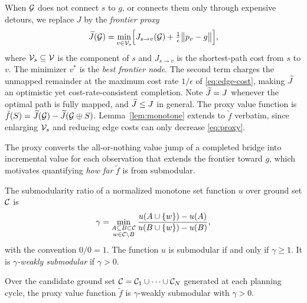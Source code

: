 When $\mathcal{G}$ does not connect $s$ to $g$, or connects them only through expensive detours, we replace $J$ by the \emph{frontier proxy}
\begin{equation} \widetilde{J}(\mathcal{G}) = \min_{v \in \mathcal{V}_s} \Bigl[ J_{s \to v}(\mathcal{G}) + \tfrac{1}{\epsilon} \bigl\| p_v - g \bigr\| \Bigr], \label{eq:proxy} \end{equation}
where $\mathcal{V}_s \subseteq \mathcal{V}$ is the component of $s$ and $J_{s \to v}$ is the shortest-path cost from $s$ to $v$. The minimizer $v^\ast$ is the \emph{best frontier node}. The second term charges the unmapped remainder at the maximum cost rate $1/\epsilon$ of \eqref{eq:edge-cost}, making $\widetilde{J}$ an optimistic yet cost-rate-consistent completion. Note $\widetilde{J} = J$ whenever the optimal path is fully mapped, and $\widetilde{J} \leq J$ in general. The proxy value function is $\tilde{f}(S) = \widetilde{J}(\mathcal{G}) - \widetilde{J}(\mathcal{G} \oplus S)$. Lemma~\ref{lem:monotone} extends to $\tilde f$ verbatim, since enlarging $\mathcal{V}_s$ and reducing edge costs can only decrease \eqref{eq:proxy}.

The proxy converts the all-or-nothing value jump of a completed bridge into incremental value for each observation that extends the frontier toward $g$, which motivates quantifying \emph{how far} $\tilde f$ is from submodular.

\begin{definition}
\label{def:gamma}
The submodularity ratio of a normalized monotone set function $u$ over ground set $\mathcal{C}$ is
\begin{equation} \gamma = \min_{\substack{A \subseteq B \subset \mathcal{C} \\ w \in \mathcal{C} \setminus B}} \frac{u(A \cup \{w\}) - u(A)}{u(B \cup \{w\}) - u(B)}, \label{eq:gamma} \end{equation}
with the convention $0/0 = 1$. The function $u$ is submodular if and only if $\gamma \geq 1$. It is \emph{$\gamma$-weakly submodular} if $\gamma > 0$.
\end{definition}

\begin{assumption}
\label{ass:gamma}
Over the candidate ground set $\mathcal{C} = \mathcal{C}_1 \cup \dots \cup \mathcal{C}_N$ generated at each planning cycle, the proxy value function $\tilde f$ is $\gamma$-weakly submodular with $\gamma > 0$.
\end{assumption}

